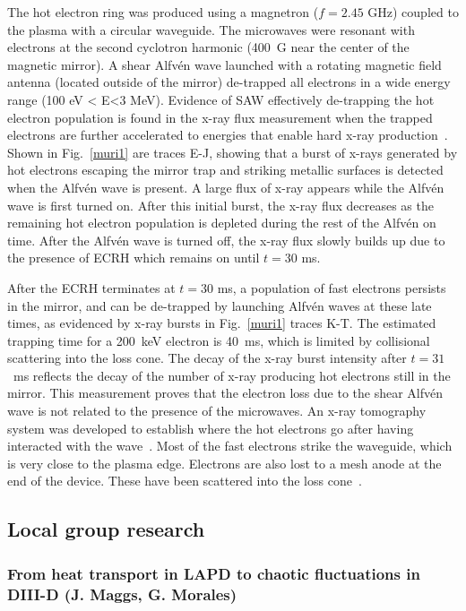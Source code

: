 \documentclass[11pt]{article}
\newcommand\Alfven{Alfv\'en }
\renewcommand{\cite}{\citep}
\begin{document}
The hot electron ring was produced using a magnetron ($f=2.45$ GHz)
coupled to the plasma with a circular waveguide. The microwaves were
resonant with electrons at the second cyclotron harmonic (400~G  near
the center of the magnetic mirror). A shear Alfv\'{e}n wave launched with a
rotating magnetic field antenna (located outside of the mirror)
de-trapped all electrons in a wide energy range (100 eV \textless{}
E\textless{}3 MeV). Evidence of SAW effectively de-trapping the hot
electron population is found in the x-ray flux measurement when the
trapped electrons are further accelerated to energies that enable hard
x-ray production~\cite{wang:2012}. Shown in Fig.~\ref{muri1} are
traces E-J, showing  that a burst of x-rays
generated by hot electrons escaping the mirror trap and striking
metallic surfaces  is detected when the \Alfven wave is present. A
large flux of x-ray appears while the Alfv\'{e}n wave is first turned on.
After this initial burst, the x-ray flux decreases as the remaining hot
electron population is depleted during the rest of the Alfv\'{e}n on time.
After the Alfv\'{e}n wave is turned off, the x-ray flux slowly builds up due
to the presence of ECRH which remains on until $t = 30$ ms.

After the ECRH terminates at $t = 30$ ms, a population of fast electrons
persists in the mirror, and can be de-trapped by launching Alfvén waves
at these late times, as evidenced by x-ray bursts in Fig.~\ref{muri1} traces K-T.
The estimated trapping time for a 200~keV electron is 40~ms, which is
limited by collisional scattering into the loss cone. The
decay of the x-ray burst intensity after $t = 31$~ms reflects the decay of
the number of x-ray producing hot electrons still in the mirror. This
measurement proves that the electron loss due to the shear Alfvén wave
is not related to the presence of the microwaves. An x-ray tomography
system was developed to establish where the hot electrons go after having
interacted with the wave~\cite{wang:2013}. Most of the fast electrons strike the
waveguide, which is very close to the plasma edge. Electrons are also
lost to a mesh anode at the end of the device. These have been scattered
into the loss cone~\cite{wang:2014}.




\subsection{Local group research}

\subsubsection{From heat transport in LAPD to chaotic fluctuations in DIII-D (J.
Maggs, G. Morales)}
\end{document}
